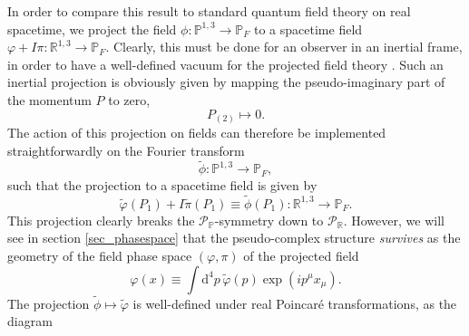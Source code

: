 \documentclass[a4paper,aps,prd,showkeys,showpacs,superscriptaddress,preprint]{revtex4}
\newcommand{\pc}{\mathbb{P}}
\newcommand{\reals}{\mathbb{R}}
\begin{document}
In order to
compare this result to standard quantum field theory on real
spacetime, we project the field $\phi: \pc^{1,3} \longrightarrow
\pc_F$ to a spacetime field $\varphi + I \pi: \reals^{1,3}
\longrightarrow \pc_F$. Clearly, this must be done for an observer in an inertial
frame, in order to have a well-defined vacuum for the projected field
theory \cite{Unruh}. Such an inertial projection is obviously given by
mapping the pseudo-imaginary part of the momentum $P$ to zero,
\begin{equation}
  P_{(2)} \mapsto 0.\label{projection1}
\end{equation}
The action of this projection on fields can therefore be
 implemented straightforwardly on the Fourier transform
\begin{equation}
  \tilde\phi: \pc^{1,3} \longrightarrow \pc_F,
\end{equation}
such that the projection to a spacetime field is given by
\begin{equation}
  \tilde \varphi (P_1) + I \tilde \pi(P_1) \equiv \tilde \phi(P_1) : \reals^{1,3}
  \longrightarrow \pc_F.\label{projection2}
\end{equation}
This projection clearly breaks the $\mathcal{P}_\pc$-symmetry down to
$\mathcal{P}_\reals$. However, we will see in section
\ref{sec_phasespace} that the pseudo-complex structure \textsl{survives} as the
geometry of the field phase space $(\varphi,\pi)$ of the projected field
\begin{equation}
  \varphi(x) \equiv \int \textrm{d}^4p\, \tilde\varphi(p) \exp(ip^\mu x_\mu). 
\end{equation}
The projection $\tilde\phi \mapsto \tilde\varphi$ is well-defined under real
Poincar\'e transformations, as the diagram
\end{document}
